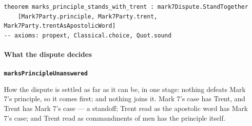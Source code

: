 \documentclass[11pt]{article}
\begin{document}
{\small\begin{verbatim}
theorem marks_principle_stands_with_trent : mark7Dispute.StandTogether
    [Mark7Party.principle, Mark7Party.trent, Mark7Party.trentAsApostolicWord]
-- axioms: propext, Classical.choice, Quot.sound
\end{verbatim}}
\paragraph*{What the dispute decides}
\leavevmode\par\nobreak
\par\medskip\noindent\textbf{\texttt{marks\allowbreak{}Principle\allowbreak{}Unanswered}}\par\nobreak\noindent
How the dispute is settled as far as it can be, in one stage: nothing defeats Mark 7’s principle, so it comes first; and nothing joins it. Mark 7’s case has Trent, and Trent has Mark 7’s case — a standoff; Trent read as the apostolic word has Mark 7’s case; and Trent read as commandments of men has the principle itself.
\end{document}
